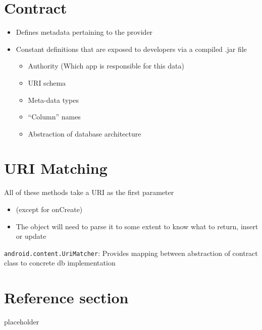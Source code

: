 \documentclass{article}
\begin{document}
\section{Contract}

\begin{itemize}
  \item Defines metadata pertaining to the provider
  \item Constant definitions that are exposed to developers via a compiled .jar file
  \begin{itemize}
    \item Authority (Which app is responsible for this data)
    \item URI schema
    \item Meta-data types 
    \item “Column” names 
    \item Abstraction of database architecture
  \end{itemize}
\end{itemize}

\section{URI Matching}

\begin{flushleft}
All of these methods take a URI as the first parameter
\begin{itemize}
  \item (except for onCreate) 
  \item The object will need to parse it to some extent to know what to return, insert or update
\end{itemize}
\verb|android.content.UriMatcher|: Provides mapping between abstraction of contract class to concrete db implementation
\end{flushleft}

\pagebreak
\section*{Reference section} \label{sec:reference}
\begin{description}
	\item[placeholder] \hfill \\
\end{description}
\end{document}
